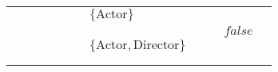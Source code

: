 \begin{table}[]
{\begin{tabular}{lllllllllll}
                          &                           &                   &                                                                          &                                                                        &                           & \cellcolor[HTML]{FC8D59}$\{\text{Actor}\}$                  &                                                                            &                                                                           &                                 &                                                                        \\
                          &                           &                   &                                                                          &                                                                        &                           &                                                             &                                                                            &                                                                           & \cellcolor[HTML]{FC8D59}$false$ &                                                                        \\
                          &                           &                   &                                                                          &                                                                        &                           & \cellcolor[HTML]{FC8D59}$\{\text{Actor}, \text{Director}\}$ &                                                                            &                                                                           &                                 &                                                                        \\
                          &                           &                   &                                                                          &                                                                        &                           &                                                             &                                                                            & \cellcolor[HTML]{FC8D59} &                                 &                                                                        \\
                          &                           &                   &                                                                          &                                                                        &                           &                                                             &                                                                            &                                                                           &                                 & \cellcolor[HTML]{FC8D59}  \\

\end{tabular}}
\end{table}

